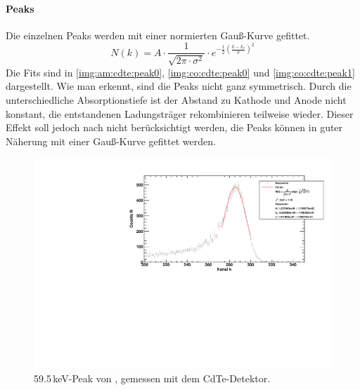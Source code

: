 \paragraph{Peaks}
Die einzelnen Peaks werden mit einer normierten Gauß-Kurve gefittet.
\begin{equation}
  \label{eq:part3:normgauss}
  N(k) = A \cdot \frac{1}{\sqrt{2\pi \cdot \sigma^2}} \cdot e^{-\frac{1}{2} \left( \frac{k-k_c}{\sigma} \right)^2}
\end{equation}
Die Fits sind in \autoref{img:am:cdte:peak0}, \autoref{img:co:cdte:peak0} und \autoref{img:co:cdte:peak1} dargestellt. Wie man erkennt, sind die 
Peaks nicht ganz symmetrisch.
Durch die unterschiedliche Absorptionstiefe ist der Abstand zu Kathode und Anode nicht konstant, die 
entstandenen Ladungsträger rekombinieren teilweise wieder. Dieser Effekt soll jedoch nach \cite{staatsex} nicht berücksichtigt werden, die 
Peaks können in guter Näherung mit einer Gauß-Kurve gefittet werden.
\begin{figure}[H]
\begin{center}
  \includegraphics[width=\textwidth]{../img/part3/Am-CdTe_00.pdf}
  \caption{59.5\,keV-Peak von \am, gemessen mit dem CdTe-Detektor.}
  \label{img:am:cdte:peak0}
\end{center}
\end{figure}

